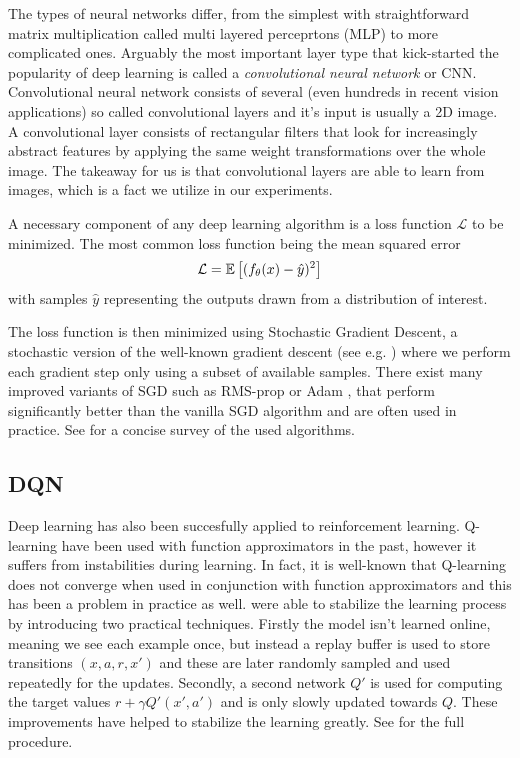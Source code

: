The types of neural networks differ, from the simplest with straightforward matrix multiplication called multi layered perceprtons (MLP) to more complicated ones. Arguably the most important layer type that kick-started the popularity of deep learning is called a \textit{convolutional neural network} or CNN. Convolutional neural network consists of several (even hundreds in recent vision applications) so called convolutional layers and it's input is usually a 2D image. A convolutional layer consists of rectangular filters that look for increasingly abstract features by applying the same weight transformations over the whole image. The takeaway for us is that convolutional layers are able to learn from images, which is a fact we utilize in our experiments.

A necessary component of any deep learning algorithm is a loss function $\mathcal{L}$ to be minimized. The most common loss function being the mean squared error
\begin{equation*}
\mathcal{L} = \mathbb{E}\left[ {(f_\theta(x) - \hat{y})^2} \right]
\end{equation*}
with samples $\hat{y}$ representing the outputs drawn from a distribution of interest. 

The loss function is then minimized using Stochastic Gradient Descent, a stochastic version of the well-known gradient descent (see e.g. \citet{boyd2004convex}) where we perform each gradient step only using a subset of available samples. 
There exist many improved variants of SGD such as RMS-prop \cite{tieleman2012lecture} or Adam \citep{kingma2014adam}, that perform significantly better than the vanilla SGD algorithm and are often used in practice. See \citet{ruder2016overview} for a concise survey of the used algorithms.


\subsection{DQN}

Deep learning has also been succesfully applied to reinforcement learning. Q-learning have been used with function approximators in the past, however it suffers from instabilities during learning. In fact, it is well-known that Q-learning does not converge when used in conjunction with function approximators \citep{baird1995residual, sutton1998reinforcement} and this has been a problem in practice as well. \citet{mnih2015human} were able to stabilize the learning process by introducing two practical techniques. Firstly the model isn't learned online, meaning we see each example once, but instead a replay buffer is used to store transitions $(x, a, r, x')$ and these are later randomly sampled and used repeatedly for the updates. Secondly, a second network $Q'$ is used for computing the target values $r + \gamma Q'(x', a')$ and is only slowly updated towards $Q$. These improvements have helped to stabilize the learning greatly. See  for the full procedure.

